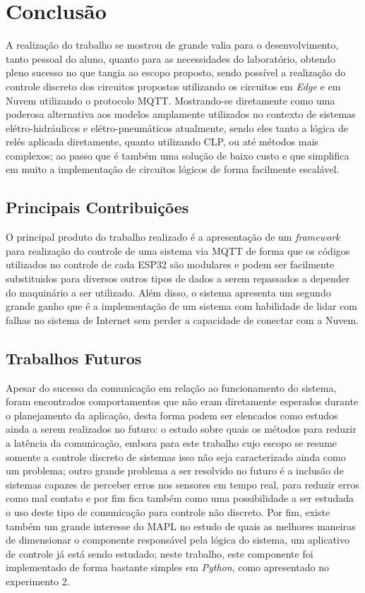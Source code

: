 \chapter[Conclusão]{Conclusão}

A realização do trabalho se mostrou de grande valia para o desenvolvimento, tanto pessoal do aluno, quanto para as 
necessidades do laboratório, obtendo pleno sucesso no que tangia ao escopo proposto, sendo possível a realização
do controle discreto dos circuitos propostos utilizando os circuitos em \textit{Edge} e em Nuvem utilizando o protocolo MQTT. 
Mostrando-se diretamente como uma poderosa alternativa aos modelos amplamente utilizados no contexto de sistemas 
elétro-hidráulicos e elétro-pneumáticos atualmente, sendo eles tanto a lógica de relés aplicada diretamente, quanto utilizando \ac{CLP}, ou até métodos 
mais complexos; ao passo que é também uma solução de baixo custo e que simplifica em muito a implementação de circuitos
lógicos de forma facilmente escalável. 

\section{Principais Contribuições}

O principal produto do trabalho realizado é a apresentação de um \textit{framework} para realização do controle de uma sistema
 via MQTT de forma que os códigos utilizados no controle de cada ESP32 são modulares e podem ser facilmente substituidos
 para diversos outros tipos de dados a serem repassados a depender do maquinário a ser utilizado. Além disso, o sistema
 apresenta um segundo grande ganho que é a implementação de um sistema com habilidade de lidar com falhas no sistema de 
 Internet sem perder a capacidade de conectar com a Nuvem.

\section{Trabalhos Futuros}

Apesar do sucesso da comunicação em relação ao funcionamento do sistema, foram encontrados comportamentos que não eram diretamente
 esperados durante o planejamento da aplicação, desta forma podem ser elencados como estudos ainda a serem realizados no 
 futuro: o estudo sobre quais os métodos para reduzir a latência da comunicação, embora para este trabalho cujo escopo se
 resume somente a controle discreto de sistemas isso não seja caracterizado ainda como um problema; outro grande problema
 a ser resolvido no futuro é a inclusão de sistemas capazes de perceber erros nos sensores em tempo real, para reduzir 
 erros como mal contato e por fim fica também como uma possibilidade a ser estudada o uso deste tipo de comunicação para 
 controle não discreto. Por fim, existe também um grande interesse do \ac{MAPL} no estudo de quais as melhores maneiras 
 de dimensionar o componente responsável pela lógica do sistema, um aplicativo de controle já está sendo estudado; neste
 trabalho, este componente foi implementado de forma bastante simples em \textit{Python}, como apresentado no experimento 2.
